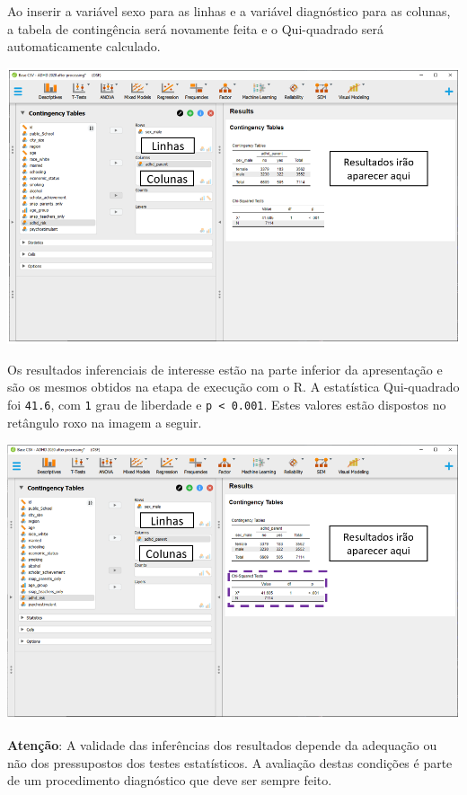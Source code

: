 \documentclass[
]{book}
\begin{document}
Ao inserir a variável sexo para as linhas e a variável diagnóstico para as colunas, a tabela de contingência será novamente feita e o Qui-quadrado será automaticamente calculado.

\includegraphics{./img/cap_x2_resultados.png}

Os resultados inferenciais de interesse estão na parte inferior da apresentação e são os mesmos obtidos na etapa de execução com o R. A estatística Qui-quadrado foi \texttt{41.6}, com \texttt{1} grau de liberdade e \texttt{p\ \textless{}\ 0.001}. Estes valores estão dispostos no retângulo roxo na imagem a seguir.

\includegraphics{./img/cap_x2_resultados2.png}

\begin{warning}

\textbf{Atenção}: A validade das inferências dos resultados depende da adequação ou não dos pressupostos dos testes estatísticos. A avaliação destas condições é parte de um procedimento diagnóstico que deve ser sempre feito.

\end{warning}
\end{document}
